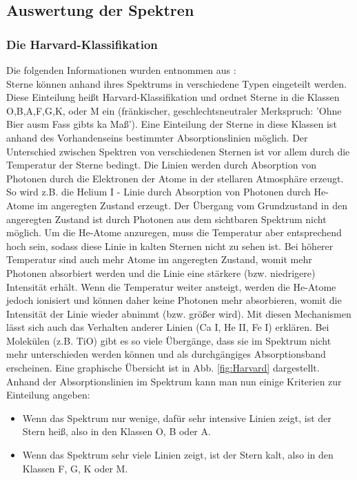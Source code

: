 \subsection{Auswertung der Spektren}
\subsubsection{Die Harvard-Klassifikation}
Die folgenden Informationen wurden entnommen aus \cite{ttunen}:\\
Sterne können anhand ihres Spektrums in verschiedene Typen eingeteilt werden. Diese Einteilung heißt Harvard-Klassifikation und ordnet Sterne in die Klassen O,B,A,F,G,K, oder M ein (fränkischer, geschlechtsneutraler Merkspruch: 'Ohne Bier ausm Fass gibts ka Maß'). Eine Einteilung der Sterne in diese Klassen ist anhand des Vorhandenseins bestimmter Absorptionslinien möglich. Der Unterschied zwischen Spektren von verschiedenen Sternen ist vor allem durch die Temperatur der Sterne bedingt. Die Linien werden durch Absorption von Photonen durch die Elektronen der Atome in der stellaren Atmosphäre erzeugt. So wird z.B. die Helium I - Linie durch Absorption von Photonen durch He-Atome im angeregten Zustand erzeugt. Der Übergang vom Grundzustand in den angeregten Zustand ist durch Photonen aus dem sichtbaren Spektrum nicht möglich. Um die He-Atome anzuregen, muss die Temperatur aber entsprechend hoch sein, sodass diese Linie in kalten Sternen nicht zu sehen ist. Bei höherer Temperatur sind auch mehr Atome im angeregten Zustand, womit mehr Photonen absorbiert werden und die Linie eine stärkere (bzw. niedrigere) Intensität erhält. Wenn die Temperatur weiter ansteigt, werden die He-Atome jedoch ionisiert und können daher keine Photonen mehr absorbieren, womit die Intensität der Linie wieder abnimmt (bzw. größer wird). Mit diesen Mechanismen lässt sich auch das Verhalten anderer Linien (Ca I, He II, Fe I) erklären. Bei Molekülen (z.B. TiO) gibt es so viele Übergänge, dass sie im Spektrum nicht mehr unterschieden werden können und als durchgängiges Absorptionsband erscheinen. Eine graphische Übersicht ist in Abb. \ref{fig:Harvard} dargestellt.
\\
Anhand der Absorptionslinien im Spektrum kann man nun einige Kriterien zur Einteilung angeben:
\begin{itemize}
\item Wenn das Spektrum nur wenige, dafür sehr intensive Linien zeigt, ist der Stern heiß, also in den Klassen O, B oder A.
\item Wenn das Spektrum sehr viele Linien zeigt, ist der Stern kalt, also in den Klassen F, G, K oder M.
\end{itemize}

